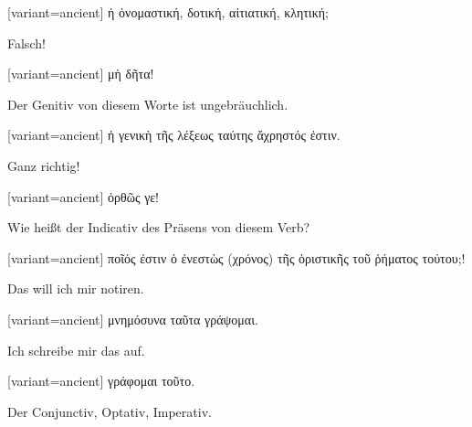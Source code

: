 \begin{greek}[variant=ancient]%
ἡ ὀνομαστική, δοτική, αἰτιατική, κλητική;

\end{greek}%
\switchcolumn*

Falsch! 

\switchcolumn

\begin{greek}[variant=ancient]%
μὴ δῆτα!

\end{greek}%
\switchcolumn*

Der Genitiv von diesem Worte ist ungebräuchlich. 

\switchcolumn

\begin{greek}[variant=ancient]%
ἡ γενικὴ τῆς λέξεως ταύτης ἄχρηστός ἐστιν.

\end{greek}%
\switchcolumn*

Ganz richtig! 

\switchcolumn

\begin{greek}[variant=ancient]%
ὀρθῶς γε!

\end{greek}%
\switchcolumn*

Wie heißt der Indicativ des Präsens von diesem Verb? 

\switchcolumn

\begin{greek}[variant=ancient]%
ποῖός ἐστιν ὁ ἐνεστὼς (χρόνος) τῆς ὁριστικῆς τοῦ ῥήματος τούτου;!

\end{greek}%
\switchcolumn*

Das will ich mir notiren. 

\switchcolumn

\begin{greek}[variant=ancient]%
μνημόσυνα ταῦτα γράψομαι.

\end{greek}%
\switchcolumn*

Ich schreibe mir das auf. 

\switchcolumn

\begin{greek}[variant=ancient]%
γράφομαι τοῦτο.

\end{greek}%
\switchcolumn*

Der Conjunctiv, Optativ, Imperativ. 

